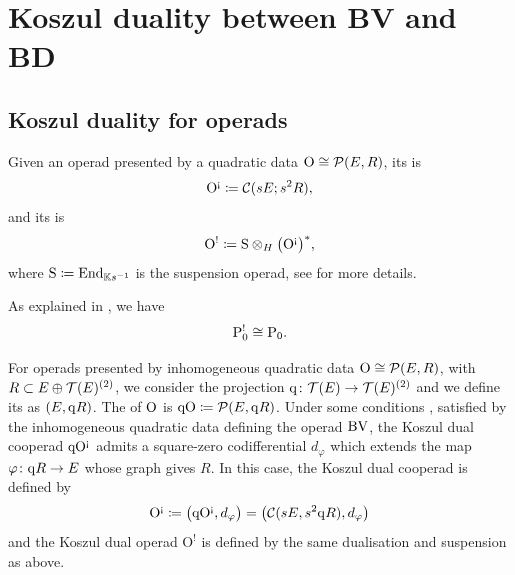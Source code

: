 
\section{Koszul duality between BV and BD}

\subsection{Koszul duality for operads}

Given an operad presented by a quadratic data \(\mathrm{O} \cong \P(E, R)\), 
its  is 
\[
\mathrm{O}^\ac \defeq \cC(sE; s^{2}R),
\]
and its  is 
\[
	\mathrm{O}^! \defeq \mathrm{S} \otimes_H \big(\mathrm{O}^{\ac}\big)^*,
\]
where \(\mathrm{S} \defeq \mathrm{End}_{\KK s^{-1}}\) is the suspension operad, see \cite[Chapter~7]{LodayVallette12} for more details. 

\begin{example}
	As explained in \cite[Section~13.3.16]{LodayVallette12}, we have
	\[
	\Pois_0^! \cong \Pois_0.
	\]
\end{example}

For operads presented by inhomogeneous quadratic data \(\mathrm{O} \cong \P(E,R)\), with \(R\subset E \oplus \cT(E)^{(2)}\), we consider the projection 
\(\q \colon \cT(E) \to \cT(E)^{(2)}\) and we define its  as \((E, \q R)\).
The  of \(\rO\) is \(\q\mathrm{O} \defeq \P(E,\q R)\).
Under some conditions \cite[Lemma~37]{GCTV12}, satisfied by the inhomogeneous quadratic data defining the operad \(\BV\), the Koszul dual cooperad \(\q \mathrm{O}^\ac\) admits a square-zero codifferential \(d_\varphi\) which extends the map \(\varphi \colon \q R \to E\) whose graph gives \(R\). In this case, the Koszul dual cooperad is defined by
\[
\mathrm{O}^\ac \defeq \big(\q \mathrm{O}^\ac, d_\varphi\big) = \big(\cC(sE, s^2 \q R), d_\varphi\big)
\]
and the Koszul dual operad \(\mathrm{O}^!\) is defined by the same dualisation and suspension as above. 

%

